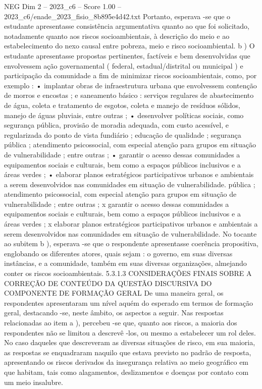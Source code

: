 \begin{textsample}{NEG Dim 2 – 2023\_c6 – Score 1.00 – 2023\_c6/enade\_2023\_fisio\_8b895e4d42.txt}
Portanto, esperava -se que o estudante apresentasse consistência argumentativa quanto ao que foi solicitado, notadamente quanto aos riscos socioambientais, à descrição do meio e ao estabelecimento do nexo causal entre pobreza, meio e risco socioambiental. b ) O estudante apresentasse propostas pertinentes, factíveis e bem desenvolvidas que envolvessem ação governamental ( federal, estadual/distrital ou municipal ) e participação da comunidade a fim de minimizar riscos socioambientais, como, por exemplo : • implantar obras de infraestrutura urbana que envolvessem contenção de morros e encostas ; e saneamento básico : serviços regulares de abastecimento de água, coleta e tratamento de esgotos, coleta e manejo de resíduos sólidos, manejo de águas pluviais, entre outras ; • desenvolver políticas sociais, como segurança pública, provisão de moradia adequada, com custo acessível, e regularizada do ponto de vista fundiário ; educação de qualidade ; segurança pública ; atendimento psicossocial, com especial atenção para grupos em situação de vulnerabilidade ; entre outras ; • garantir o acesso dessas comunidades a equipamentos sociais e culturais, bem como a espaços públicos inclusivos e a áreas verdes ; • elaborar planos estratégicos participativos urbanos e ambientais a serem desenvolvidos nas comunidades em situação de vulnerabilidade. pública ; atendimento psicossocial, com especial atenção para grupos em situação de vulnerabilidade ; entre outras ; x garantir o acesso dessas comunidades a equipamentos sociais e culturais, bem como a espaços públicos inclusivos e a áreas verdes ; x elaborar planos estratégicos participativos urbanos e ambientais a serem desenvolvidos nas comunidades em situação de vulnerabilidade.
No tocante ao subitem b ), esperava -se que o respondente apresentasse coerência propositiva, englobando os diferentes atores, quais sejam : o governo, em suas diversas instâncias, e a comunidade, também em suas diversas organizações, almejando conter os riscos socioambientais. 5.3.1.3 CONSIDERAÇÕES FINAIS SOBRE A CORREÇÃO DE CONTEÚDO DA QUESTÃO DISCURSIVA DO COMPONENTE DE FORMAÇÃO GERAL De uma maneira geral, os respondentes apresentaram um nível aquém do esperado em termos de formação geral, destacando -se, neste âmbito, os aspectos a seguir.
Nas respostas relacionadas ao item a ), percebeu -se que, quanto aos riscos, a maioria dos respondentes não se limitou a descrevê -los, ou mesmo a estabelecer um rol deles.
No caso daqueles que descreveram as diversas situações de risco, em sua maioria, as respostas se enquadraram naquilo que estava previsto no padrão de resposta, apresentando os riscos derivados da insegurança relativa ao meio geográfico em que habitam, tais como alagamentos, deslizamentos e doenças por contato com um meio insalubre.

\end{textsample}
